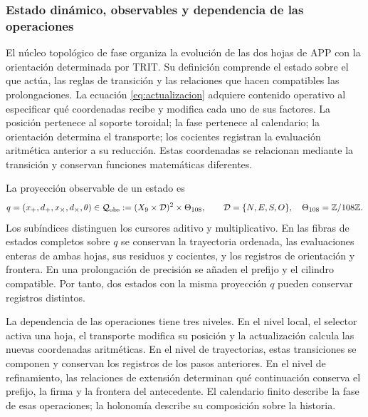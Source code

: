 
\subsubsection{Estado dinámico, observables y dependencia de las operaciones}
\label{tpk-int:estado}

El núcleo topológico de fase organiza la evolución de las dos hojas de APP
con la orientación determinada por TRIT. Su definición comprende el estado
sobre el que actúa, las reglas de transición y las relaciones que hacen
compatibles las prolongaciones. La ecuación \eqref{eq:actualizacion} adquiere
contenido operativo al especificar qué coordenadas recibe y modifica cada
uno de sus factores. La posición pertenece al soporte toroidal; la fase
pertenece al calendario; la orientación determina el transporte; los
cocientes registran la evaluación aritmética anterior a su reducción.
Estas coordenadas se relacionan mediante la transición y conservan funciones
matemáticas diferentes.

La proyección observable de un estado es
\begin{equation}
 q=(x_+,d_+,x_\times,d_\times,\theta)
 \in\mathcal Q_{\rm obs}
 :=(X_9\times\mathcal D)^2\times\Theta_{108},
 \qquad \mathcal D=\{N,E,S,O\},\quad
 \Theta_{108}=\mathbb Z/108\mathbb Z.
 \label{tpk-int:qobs}
\end{equation}
Los subíndices distinguen los cursores aditivo y multiplicativo. En las
fibras de estados completos sobre \(q\) se conservan la trayectoria ordenada, las evaluaciones
enteras de ambas hojas, sus residuos y cocientes, y los registros de
orientación y frontera. En una prolongación de precisión se añaden el
prefijo y el cilindro compatible. Por tanto, dos estados con la misma
proyección \(q\) pueden conservar registros distintos.

La dependencia de las operaciones tiene tres niveles. En el nivel local,
el selector activa una hoja, el transporte modifica su posición y la
actualización calcula las nuevas coordenadas aritméticas. En el nivel de
trayectorias, estas transiciones se componen y conservan los registros de
los pasos anteriores. En el nivel de refinamiento, las relaciones de
extensión determinan qué continuación conserva el prefijo, la firma y la
frontera del antecedente. El calendario finito describe la fase de esas
operaciones; la holonomía describe su composición sobre la historia.


